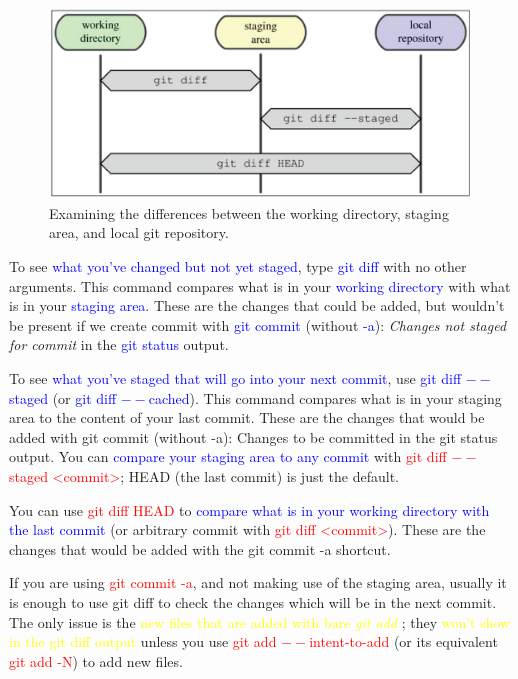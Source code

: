 \documentclass[12pt,a4paper]{article}
\begin{document}
\begin{figure}
\begin{center}
\includegraphics[width=12cm]{git_diff.eps}
\caption{Examining the differences between the working directory, staging area, and local git repository. 
}
\label{FIG:git_diff}
\end{center}
\end{figure}

To see \textcolor{blue}{what you've changed but not yet staged}, type \textcolor{blue}{git diff} with no other arguments. This command compares what is in your \textcolor{blue}{working directory} with what is in your \textcolor{blue}{staging area}. These are the changes that could be added, but wouldn't be present if we create commit with \textcolor{blue}{git commit} (without \textcolor{blue}{-a}): \textit{Changes not staged for commit} in the \textcolor{blue}{git status} output. 

To see \textcolor{blue}{what you've staged that will go into your next commit}, use \textcolor{blue}{git diff $--$staged} (or \textcolor{blue}{git diff $--$cached}). This command compares what is in your staging area to the content of your last commit. These are the changes that would be added with git commit (without -a): Changes to be committed in the git status output. You can \textcolor{blue}{compare your staging area to any commit} with \textcolor{red}{git diff $--$staged <commit>}; HEAD (the last commit) is just the default.

You can use \textcolor{red}{git diff HEAD} to \textcolor{blue}{compare what is in your working directory with the last commit} (or arbitrary commit with \textcolor{red}{git diff <commit>}). These are the changes that would be added with the git commit -a shortcut.

If you are using \textcolor{red}{git commit -a}, and not making use of the staging area, usually it is enough to use git diff to check the changes which will be in the next commit. The only issue is the \textcolor{yellow}{new files that are added with bare \textit{git add} }; they \textcolor{yellow}{won't show in the git diff output} unless you use \textcolor{red}{git add $--$intent-to-add} (or its equivalent \textcolor{red}{git add -N}) to add new files.
\end{document}
